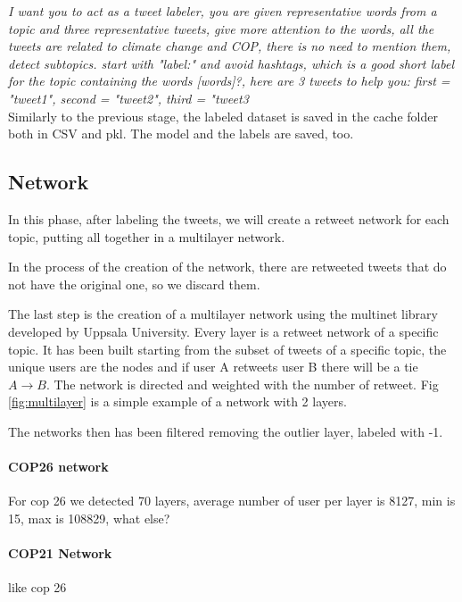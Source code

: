 \textit{    I want you to act as a tweet labeler, you are given representative words
from a topic and three representative tweets, give more attention to the words, all the tweets are related to climate change and COP, there is no need to mention them, detect subtopics.
start with "label:" and avoid hashtags,
which is a good short label for the topic containing the words [{words}]?, here are 3 tweets to help you:
first = "{tweet1}", second = "{tweet2}", third = "{tweet3}}
\\

Similarly to the previous stage, the labeled dataset is saved in the cache folder both in CSV and pkl. The model and the labels are saved, too.



\subsection{Network}
In this phase, after labeling the tweets, we will create a retweet network for each topic, putting all together in a multilayer network.

In the process of the creation of the network, there are retweeted tweets that do not have the original one, so we discard them.

The last step is the creation of a multilayer network using the multinet library developed by Uppsala University.  Every layer is a retweet network of a specific topic. It has been built starting from the subset of tweets of a specific topic, the unique users are the nodes and if user A retweets user B there will be a tie $A \rightarrow B$. The network is directed and weighted with the number of retweet. Fig \ref{fig:multilayer} is a simple example of a network with 2 layers.

The networks then has been filtered removing the outlier layer, labeled with -1.

\paragraph{COP26 network}
For cop 26 we detected 70 layers,  average number of user per layer is 8127, min is 15, max is 108829, what else?

\paragraph{COP21 Network}
like cop 26



